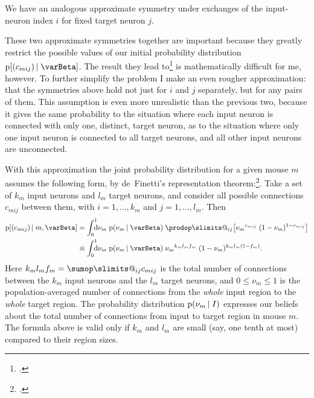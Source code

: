 \documentclass[\ifafour a4paper,12pt,\else a5paper,10pt,\fi%
onecolumn,oneside,article,%
british%
]{memoir}
\makeatletter
\theoremstyle{remark}
\theoremstyle{innote}
\def\sum{\DOTSI\sumop\slimits@}
\def\prod{\DOTSI\prodop\slimits@}
\newcommand*{\citep}{\footcites}
\newcommand*{\di}{\mathrm{d}}%
\renewcommand*{\le}{\leqslant}%
\newcommand*{\pf}{\mathrm{p}}%
\renewcommand*{\|}[1][]{\nonscript\,#1\vert\nonscript\;\mathopen{}}
\newcommand*{\yI}{\varBeta}
\newcommand*{\yc}{c}
\newcommand*{\yf}{f}
\makeatother
\begin{document}
We have an analogous approximate symmetry under exchanges of the
input-neuron index $i$ for fixed target neuron $j$.

These two approximate symmetries together are important because they
greatly restrict the possible values of our initial probability
distribution $\pf[(\yc_{mij}) \| \yI]$. The result they lead
to\citep{hoover1979,aldous1981,diaconisetal1981b} is mathematically
difficult for me, however. To further simplify the problem I make an even
rougher approximation: that the symmetries above hold not just for $i$ and
$j$ separately, but for any pairs of them. This assumption is even more
unrealistic than the previous two, because it gives the same probability to
the situation where each input neuron is connected with only one, distinct,
target neuron, as to the situation where only one input neuron is connected
to all target neurons, and all other input neurons are unconnected.

With this approximation the joint probability distribution for a given
mouse $m$ assumes the following form, by de~Finetti's representation
theorem:\citep{definetti1930,hewittetal1955,heathetal1976,diaconis1977,diaconisetal1980,dawid2013}.
Take a set of $k_{m}$ input neurons and $l_{m}$ target neurons, and
consider all possible connections $\yc_{mij}$ between them, with
$i=1,\dotsc,k_{m}$ and $j=1,\dotsc,l_{m}$. Then
\begin{equation}
  \label{eq:definetti_ij}
  \begin{split}
  \pf[(\yc_{mij}) \| m, \yI] &=
  \int_{0}^{1}\!\!\!\!\di\nu_{m}\;\pf(\nu_{m} \| \yI)\;
  \prod_{ij}\bigl[
  {\nu_{m}}^{\yc_{mij}}\;(1-\nu_{m})^{1-\yc_{mij}}
  \bigr]
  \\
  &\equiv \int_{0}^{1}\!\!\!\!\di\nu_{m}\;\pf(\nu_{m} \| \yI)\;
  {\nu_{m}}^{k_{m}l_{m}\yf_{m}}\;
  (1-\nu_{m})^{k_{m}l_{m}(1-\yf_{m})}.
\end{split}
\end{equation}
Here $k_{m}l_{m}\yf_{m} = \sum_{ij} \yc_{mij}$ is the total number of
connections between the $k_{m}$ input neurons and the $l_{m}$ target
neurons, and $0\le \nu_{m} \le 1$ is the population-averaged number of
connections from the \emph{whole} input region to the \emph{whole} target
region. The probability distribution $\pf(\nu_{m} \| I)$ expresses our
beliefs about the total number of connections from input to target region
in mouse $m$. The formula above is valid only if $k_{m}$ and $l_{m}$ are
small (say, one tenth at most) compared to their region sizes.
\end{document}
